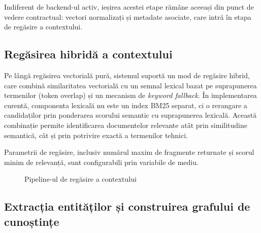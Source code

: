 \documentclass[12pt, a4paper, oneside, romanian]{teza-upb}
\begin{document}
Indiferent de backend-ul activ, ieșirea acestei etape rămâne aceeași din punct de vedere contractual: vectori normalizați și metadate asociate, care intră în etapa de regăsire a contextului.

\subsection{Regăsirea hibridă a contextului}

Pe lângă regăsirea vectorială pură, sistemul suportă un mod de regăsire hibrid, care combină similaritatea vectorială cu un semnal lexical bazat pe suprapunerea termenilor (token overlap) și un mecanism de \textit{keyword fallback}. În implementarea curentă, componenta lexicală nu este un index BM25 separat, ci o rerangare a candidaților prin ponderarea scorului semantic cu suprapunerea lexicală. Această combinație permite identificarea documentelor relevante atât prin similitudine semantică, cât și prin potrivire exactă a termenilor tehnici.

Parametrii de regăsire, inclusiv numărul maxim de fragmente returnate și scorul minim de relevanță, sunt configurabili prin variabile de mediu.

\begin{figure}[H]
\centering
{}
\caption{Pipeline-ul de regăsire a contextului}
\label{fig:rag-retrieval}
\end{figure}


\subsection{Extracția entităților și construirea grafului de cunoștințe}
\end{document}
